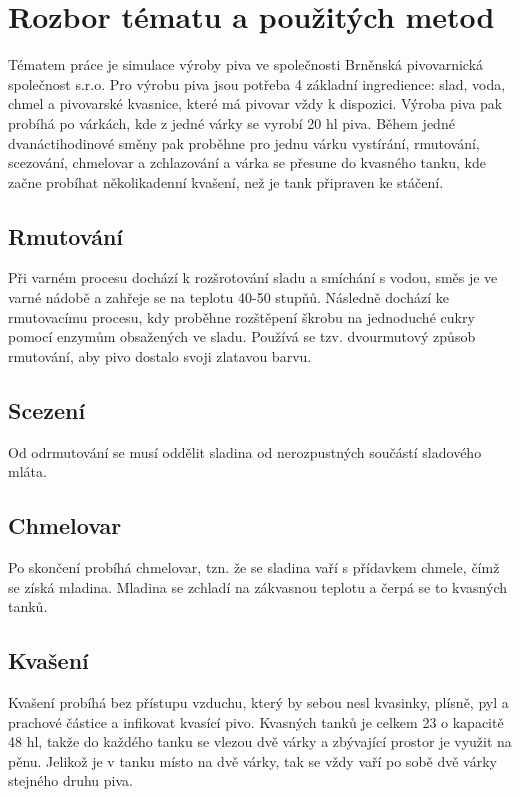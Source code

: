 \documentclass[11pt,a4paper]{article}
\begin{document}
\section{Rozbor tématu a použitých metod} \label{sec:rozbor}
Tématem práce je simulace \cite[str. 8]{pred} výroby piva ve společnosti Brněnská pivovarnická společnost s.r.o. Pro výrobu piva jsou potřeba 4 základní ingredience: slad, voda, chmel a pivovarské kvasnice, které má pivovar vždy k dispozici. Výroba piva pak probíhá po várkách, kde z jedné várky se vyrobí 20 hl piva. Během jedné dvanáctihodinové směny pak proběhne pro jednu várku vystírání, rmutování, scezování, chmelovar a zchlazování a várka se přesune do kvasného tanku, kde začne probíhat několikadenní kvašení, než je tank připraven ke stáčení.

\subsection{Rmutování}
Při varném procesu dochází k rozšrotování sladu a smíchání s vodou, směs je ve varné nádobě a zahřeje se na teplotu 40-50 stupňů. Následně dochází ke rmutovacímu procesu, kdy proběhne rozštěpení škrobu na jednoduché cukry pomocí enzymům obsažených ve sladu. Používá se tzv. dvourmutový způsob rmutování, aby pivo dostalo svoji zlatavou barvu.

\subsection{Scezení}
Od odrmutování se musí oddělit sladina od nerozpustných součástí sladového mláta.

\subsection{Chmelovar}
Po skončení probíhá chmelovar, tzn. že se sladina vaří s přídavkem chmele, čímž se získá mladina. Mladina se zchladí na zákvasnou teplotu a čerpá se to kvasných tanků. 

\subsection{Kvašení}
Kvašení probíhá bez přístupu vzduchu, který by sebou nesl kvasinky, plísně, pyl a prachové částice a infikovat kvasící pivo. Kvasných tanků je celkem 23 o kapacitě 48 hl, takže do každého tanku se vlezou dvě várky a zbývající prostor je využit na pěnu. Jelikož je v tanku místo na dvě várky, tak se vždy vaří po sobě dvě várky stejného druhu piva. 
\end{document}
